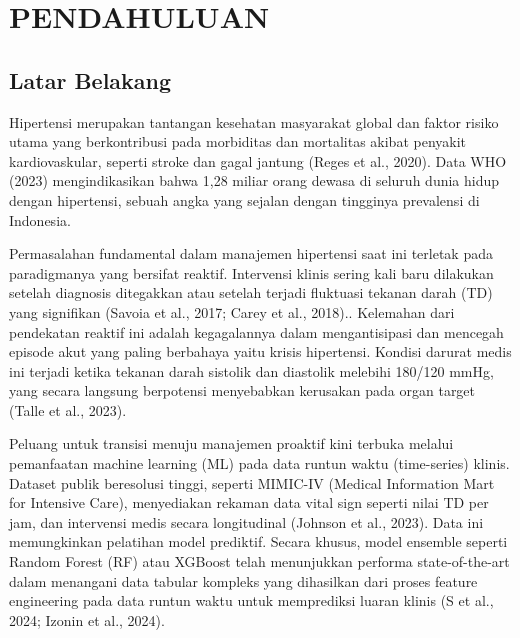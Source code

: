\chapter{PENDAHULUAN}
\label{chap:pendahuluan}

\section{Latar Belakang}
Hipertensi merupakan tantangan kesehatan masyarakat global dan faktor risiko utama yang berkontribusi pada morbiditas dan mortalitas akibat penyakit kardiovaskular, seperti stroke dan gagal jantung (Reges et al., 2020). Data WHO (2023) mengindikasikan bahwa 1,28 miliar orang dewasa di seluruh dunia hidup dengan hipertensi, sebuah angka yang sejalan dengan tingginya prevalensi di Indonesia.

Permasalahan fundamental dalam manajemen hipertensi saat ini terletak pada paradigmanya yang bersifat reaktif. Intervensi klinis sering kali baru dilakukan setelah diagnosis ditegakkan atau setelah terjadi fluktuasi tekanan darah (TD) yang signifikan (Savoia et al., 2017; Carey et al., 2018).. Kelemahan dari pendekatan reaktif ini adalah kegagalannya dalam mengantisipasi dan mencegah episode akut yang paling berbahaya yaitu krisis hipertensi. Kondisi darurat medis ini terjadi ketika tekanan darah sistolik dan diastolik melebihi 180/120 mmHg, yang secara langsung berpotensi menyebabkan kerusakan pada organ target (Talle et al., 2023).

Peluang untuk transisi menuju manajemen proaktif kini terbuka melalui pemanfaatan machine learning (ML) pada data runtun waktu (time-series) klinis. Dataset publik beresolusi tinggi, seperti MIMIC-IV (Medical Information Mart for Intensive Care), menyediakan rekaman data vital sign seperti nilai TD per jam, dan intervensi medis secara longitudinal (Johnson et al., 2023). Data ini memungkinkan pelatihan model prediktif. Secara khusus, model ensemble seperti Random Forest (RF) atau XGBoost telah menunjukkan performa state-of-the-art dalam menangani data tabular kompleks yang dihasilkan dari proses feature engineering pada data runtun waktu untuk memprediksi luaran klinis (S et al., 2024; Izonin et al., 2024).

